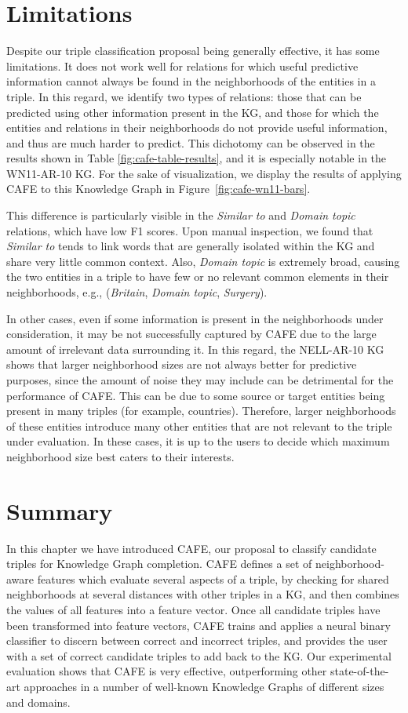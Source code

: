 \section{Limitations}\label{sec:cafe-limitations}
Despite our triple classification proposal being generally effective, it has some limitations. It does not work well for relations for which useful predictive information cannot always be found in the neighborhoods of the entities in a triple. In this regard, we identify two types of relations: those that can be predicted using other information present in the KG, and those for which the entities and relations in their neighborhoods do not provide useful information, and thus are much harder to predict. This dichotomy can be observed in the results shown in Table \ref{fig:cafe-table-results}, and it is especially notable in the WN11-AR-10 KG. For the sake of visualization, we display the results of applying CAFE to this Knowledge Graph in Figure~\ref{fig:cafe-wn11-bars}.

This difference is particularly visible in the \textit{Similar to} and \textit{Domain topic} relations, which have low F1 scores. Upon manual inspection, we found that \textit{Similar to} tends to link words that are generally isolated within the KG and share very little common context. Also, \textit{Domain topic} is extremely broad, causing the two entities in a triple to have few or no relevant common elements in their neighborhoods, e.g., (\textit{Britain}, \textit{Domain topic}, \textit{Surgery}).

In other cases, even if some information is present in the neighborhoods under consideration, it may be not successfully captured by CAFE due to the large amount of irrelevant data surrounding it. In this regard, the NELL-AR-10 KG shows that larger neighborhood sizes are not always better for predictive purposes, since the amount of noise they may include can be detrimental for the performance of CAFE. This can be due to some source or target entities being present in many triples (for example, countries). Therefore, larger neighborhoods of these entities introduce many other entities that are not relevant to the triple under evaluation. In these cases, it is up to the users to decide which maximum neighborhood size best caters to their interests.

\section{Summary}\label{sec:cafe-summary}
In this chapter we have introduced CAFE, our proposal to classify candidate triples for Knowledge Graph completion. CAFE defines a set of neighborhood-aware features which evaluate several aspects of a triple, by checking for shared neighborhoods at several distances with other triples in a KG, and then combines the values of all features into a feature vector. Once all candidate triples have been transformed into feature vectors, CAFE trains and applies a neural binary classifier to discern between correct and incorrect triples, and provides the user with a set of correct candidate triples to add back to the KG. Our experimental evaluation shows that CAFE is very effective, outperforming other state-of-the-art approaches in a number of well-known Knowledge Graphs of different sizes and domains.
